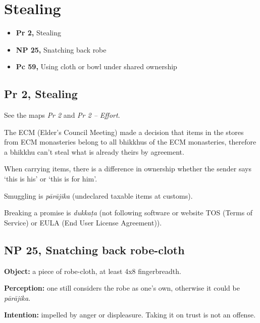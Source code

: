 \chapter{Stealing}

\begin{itemize}
\tightlist
\item
  \textbf{Pr 2,} Stealing
\item
  \textbf{NP 25,} Snatching back robe
\item
  \textbf{Pc 59,} Using cloth or bowl under shared ownership
\end{itemize}

\enlargethispage*{4\baselineskip}
\par
{}
\par
\vspace*{-2\baselineskip}

\section{Pr 2, Stealing}

See the maps \emph{Pr 2} and \emph{Pr 2 -- Effort}.

The ECM (Elder's Council Meeting) made a decision that items in the
stores from ECM monasteries belong to all bhikkhus of the ECM
monasteries, therefore a bhikkhu can't steal what is already theirs by
agreement.

When carrying items, there is a difference in ownership whether the
sender says `this is his' or `this is for him'.

Smuggling is \emph{pārājika} (undeclared taxable items at customs).

Breaking a promise is \emph{dukkaṭa} (not following software or website
TOS (Terms of Service) or EULA (End User License Agreement)).

\section{NP 25, Snatching back robe-cloth}

\textbf{Object:} a piece of robe-cloth, at least 4x8 fingerbreadth.

\textbf{Perception:} one still considers the robe as one's own,
otherwise it could be \emph{pārājika}.

\textbf{Intention:} impelled by anger or displeasure. Taking it on trust
is not an offense.

